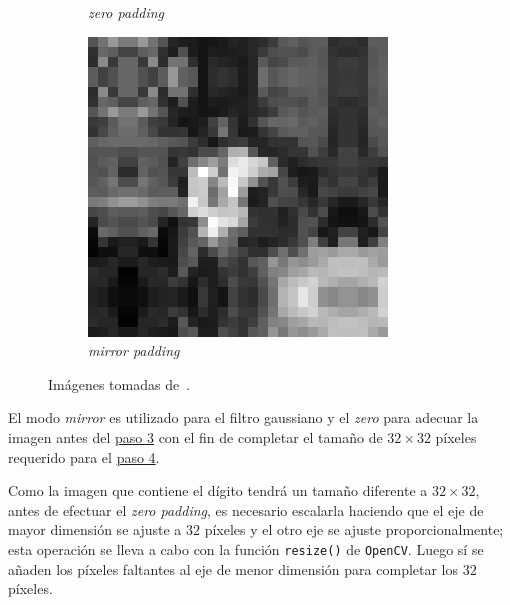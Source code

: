 \begin{figure}[h!]
\begin{subfigure}[t]{0.3\textwidth}
        \caption{\emph{zero padding}}
    \end{subfigure}
    \hfill
    \begin{subfigure}[t]{0.3\textwidth}
        \includegraphics[width=\textwidth]{3_Reconocimiento/Figs/mirror_padding}
        \caption{\emph{mirror padding}}
    \end{subfigure}
    \caption*{\footnotesize Imágenes tomadas de~\citep{Richard2011}.}
\end{figure}

El modo \emph{mirror} es utilizado para el filtro gaussiano y el \emph{zero} para adecuar la imagen antes del \hyperref[sec:segmentation]{paso 3} con el fin de completar el tamaño de $32 \times 32$ píxeles requerido para el \hyperref[sec:sift_descriptor]{paso 4}.

Como la imagen que contiene el dígito tendrá un tamaño diferente a $32 \times 32$, antes de efectuar el \emph{zero padding}, es necesario escalarla haciendo que el eje de mayor dimensión se ajuste a $32$ píxeles y el otro eje se ajuste proporcionalmente;
esta operación se lleva a cabo con la función \texttt{\small resize()} de \texttt{\small OpenCV}.
Luego sí se añaden los píxeles faltantes al eje de menor dimensión para completar los $32$ píxeles.
\vfill

